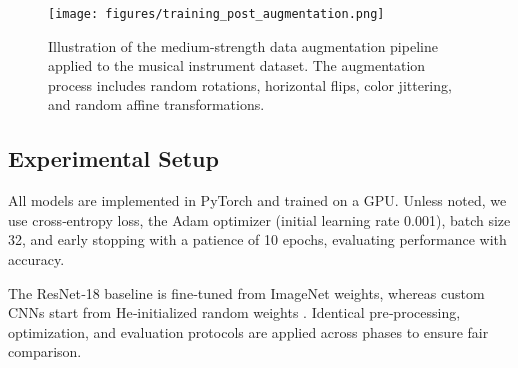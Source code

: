 \begin{figure}[htbp]
    \centering
    \texttt{[image: figures/training\_post\_augmentation.png]}
    \caption{Illustration of the medium-strength data augmentation pipeline applied to the musical instrument dataset. The augmentation process includes random rotations, horizontal flips, color jittering, and random affine transformations.}
    \label{fig:training_augmentation}
\end{figure}



\subsection{Experimental Setup}
\noindent
All models are implemented in PyTorch and trained on a GPU. Unless noted, we use cross‑entropy loss, the Adam optimizer (initial learning rate 0.001), batch size 32, and early stopping with a patience of 10 epochs, evaluating performance with accuracy.

\noindent
The ResNet‑18 baseline is fine‑tuned from ImageNet weights, whereas custom CNNs start from He‑initialized random weights \cite{he2015delving}. Identical pre‑processing, optimization, and evaluation protocols are applied across phases to ensure fair comparison.
